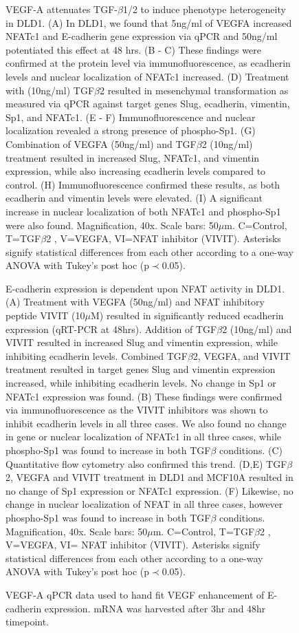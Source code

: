 \documentclass[11pt,letterpaper]{article}
\begin{document}
\begin{figure}
\caption{VEGF-A attenuates TGF-$\beta$1/2 to induce phenotype heterogeneity in DLD1.
(A) In DLD1, we found that 5ng/ml of VEGFA increased NFATc1 and E-cadherin gene expression via qPCR and 50ng/ml potentiated this effect at 48 hrs.
(B - C) These findings were confirmed at the protein level via immunofluorescence, as ecadherin levels and nuclear localization of NFATc1 increased.
(D) Treatment with (10ng/ml) TGF$\beta$2 resulted in mesenchymal transformation as measured via qPCR against target genes Slug, ecadherin, vimentin, Sp1, and NFATc1.
(E - F) Immunofluorescence and nuclear localization revealed a strong presence of phospho-Sp1.
(G) Combination of VEGFA (50ng/ml) and TGF$\beta$2 (10ng/ml) treatment resulted in increased Slug, NFATc1, and vimentin expression, while also increasing ecadherin levels compared to control.
(H) Immunofluorescence confirmed these results, as both ecadherin and vimentin levels were elevated.
(I) A significant increase in nuclear localization of both NFATc1 and phospho-Sp1 were also found.
Magnification, 40x. Scale bars: 50$\mu$m.  C=Control, T=TGF$\beta$2 , V=VEGFA, VI=NFAT inhibitor (VIVIT).
Asterisks signify statistical differences from each other according to a one-way ANOVA with Tukey's post hoc (p$\prec$0.05).}\label{fg:S3}
\end{figure}

\begin{figure}
\caption{E-cadherin expression is dependent upon NFAT activity in DLD1.
(A) Treatment with VEGFA (50ng/ml) and NFAT inhibitory peptide VIVIT (10$\mu$M) resulted in significantly reduced ecadherin expression (qRT-PCR at 48hrs).
Addition of TGF$\beta$2 (10ng/ml) and VIVIT resulted in increased Slug and vimentin expression, while inhibiting ecadherin levels.
Combined TGF$\beta$2, VEGFA, and VIVIT treatment resulted in target genes Slug and vimentin expression increased, while inhibiting ecadherin levels.
No change in Sp1 or NFATc1 expression was found.
(B) These findings were confirmed via immunofluorescence as the VIVIT inhibitors was shown to inhibit ecadherin levels in all three cases.
We also found no change in gene or nuclear localization of NFATc1 in all three cases, while phospho-Sp1 was found to increase in both TGF$\beta$ conditions.
(C) Quantitative flow cytometry also confirmed this trend.
(D,E)  TGF$\beta$2, VEGFA and VIVIT treatment in DLD1 and MCF10A resulted in no change of Sp1 expression or NFATc1 expression.
(F)  Likewise, no change in nuclear localization of NFAT in all three cases, however phospho-Sp1 was found to increase in both TGF$\beta$ conditions.
Magnification, 40x. Scale bars: 50$\mu$m.  C=Control, T=TGF$\beta$2 , V=VEGFA, VI= NFAT inhibitor (VIVIT).
Asterisks signify statistical differences from each other according to a one-way ANOVA with Tukey's post hoc (p$\prec$0.05).}\label{fg:S4}
\end{figure}

\begin{figure}
	\caption{VEGF-A qPCR data used to hand fit VEGF enhancement of E-cadherin expression. mRNA was harvested after 3hr and 48hr timepoint.}\label{fg:VEGFA-Data}
\end{figure}

\newpage
%
\end{document}
